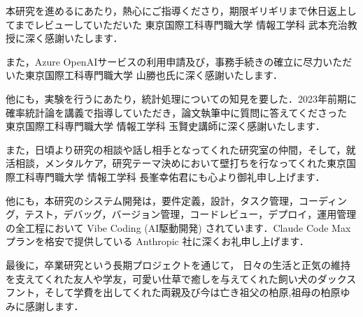 \documentclass[senior,final,11pt,dvipdfmx]{iputit-thesis}
\begin{document}
\begin{acknowledge}
本研究を進めるにあたり，熱心にご指導くださり，期限ギリギリまで休日返上してまでレビューしていただいた 東京国際工科専門職大学 情報工学科 武本充治教授に深く感謝いたします．

また，Azure OpenAIサービスの利用申請及び，事務手続きの確立に尽力いただいた東京国際工科専門職大学 山\ajTatsuSaki 勝也氏に深く感謝いたします．

他にも，実験を行うにあたり，統計処理についての知見を要した．2023年前期に確率統計論を講義で指導していただき，論文執筆中に質問に答えてくださった 東京国際工科専門職大学 情報工学科 玉賢史講師に深く感謝いたします．

また，日頃より研究の相談や話し相手となってくれた研究室の仲間，そして，就活相談，メンタルケア，研究テーマ決めにおいて壁打ちを行なってくれた東京国際工科専門職大学 情報工学科 長峯幸佑君にも心より御礼申し上げます．

他にも，本研究のシステム開発は，要件定義，設計，タスク管理，コーディング，テスト，デバッグ，バージョン管理，コードレビュー，デプロイ，運用管理の全工程において Vibe Coding (AI駆動開発) されています．Claude Code Max プランを格安で提供している Anthropic 社に深くお礼申し上げます．

最後に，卒業研究という長期プロジェクトを通じて，
日々の生活と正気の維持を支えてくれた友人や学友，可愛い仕草で癒しを与えてくれた飼い犬のダックスフント，そして学費を出してくれた両親及び今は亡き祖父の柏原,祖母の柏原ゆみに感謝します．
\end{acknowledge}
\end{document}
